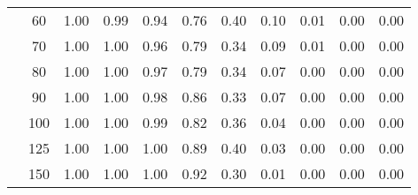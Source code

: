 \begin{table}[t]
\begin{center}
\begin{subtable}[c]{\textwidth}
\begin{center}
\begin{tabular}{rcccccccccc}
                                        & \multicolumn{1}{c|}{60}  & \num{1.00}  & \num{0.99}  & \num{0.94}  & \num{0.76}  & \num{0.40}  & \num{0.10}  & \num{0.01}  & \num{0.00}  & \num{0.00}  \\
                                        & \multicolumn{1}{c|}{70}  & \num{1.00}  & \num{1.00}  & \num{0.96}  & \num{0.79}  & \num{0.34}  & \num{0.09}  & \num{0.01}  & \num{0.00}  & \num{0.00}  \\
                                        & \multicolumn{1}{c|}{80}  & \num{1.00}  & \num{1.00}  & \num{0.97}  & \num{0.79}  & \num{0.34}  & \num{0.07}  & \num{0.00}  & \num{0.00}  & \num{0.00}  \\
                                        & \multicolumn{1}{c|}{90}  & \num{1.00}  & \num{1.00}  & \num{0.98}  & \num{0.86}  & \num{0.33}  & \num{0.07}  & \num{0.00}  & \num{0.00}  & \num{0.00}  \\
                                        & \multicolumn{1}{c|}{100}  & \num{1.00}  & \num{1.00}  & \num{0.99}  & \num{0.82}  & \num{0.36}  & \num{0.04}  & \num{0.00}  & \num{0.00}  & \num{0.00}  \\
                                        & \multicolumn{1}{c|}{125}  & \num{1.00}  & \num{1.00}  & \num{1.00}  & \num{0.89}  & \num{0.40}  & \num{0.03}  & \num{0.00}  & \num{0.00}  & \num{0.00}  \\
                                        & \multicolumn{1}{c|}{150}  & \num{1.00}  & \num{1.00}  & \num{1.00}  & \num{0.92}  & \num{0.30}  & \num{0.01}  & \num{0.00}  & \num{0.00}  & \num{0.00}  \\
                                    \end{tabular}
            \end{center}
        \end{subtable}

        \vspace{5mm}


\end{center}
\end{table}
